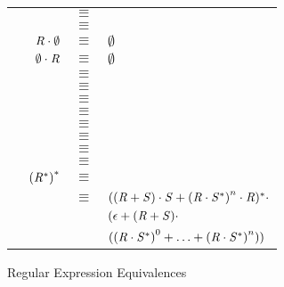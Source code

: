 \begin{figure}
\setcounter{rowcount}{0}
\centering
\begin{tabular}{lrcl}
\EqualityRule{} & \Regex{} & $\equiv$ & \Regex{} \\
\OrIdentityRule{} & \RegexOr{\Regex}{\emptyset} & $\equiv$ & \Regex{} \\
\EmptyProjectionRuleRightRule{} & $\mathit{R}\cdot\emptyset$ & $\equiv$ & $\emptyset$ \\
\EmptyProjectionRuleLeftRule{}\SubLeft{} & $\emptyset\cdot\mathit{R}$ & $\equiv$ & $\emptyset$ \\
\ConcatAssocRule{} & \RegexConcat{(\RegexConcat{\Regex{}}{\Regex'})}{\Regex''} & $\equiv$ & \RegexConcat{\Regex{}}{(\RegexConcat{\Regex'}{\Regex''})} \\
\OrAssociativityRule{} & \RegexOr{(\RegexOr{\Regex}{\Regex'})}{\Regex''} & $\equiv$ & \RegexOr{\Regex}{(\RegexOr{\Regex'}{\Regex''})} \\
\OrCommutativityRule{} & \RegexOr{\Regex{}}{\RegexAlt{}} & $\equiv$ & \RegexOr{\RegexAlt{}}{\Regex{}}\\
\DistributivityLeftRule{} & \RegexConcat{\Regex{}}{(\RegexOr{\Regex{}'}{\Regex{}''})} & $\equiv$ & \RegexOr{(\RegexConcat{\Regex{}}{\Regex{}'})}{(\RegexConcat{\Regex{}}{\Regex{}''})} \\
\DistributivityRightRule{} & \RegexConcat{(\RegexOr{\Regex{}'}{\Regex{}''})}{\Regex{}} & $\equiv$ & \RegexOr{(\RegexConcat{\Regex{}'}{\Regex{}})}{(\RegexConcat{\Regex{}''}{\Regex{}})} \\
\ConcatIdentityRule{} &\RegexConcat{\Regex{}}{\EmptyString{}} & $\equiv$ & \Regex{}\\
\SumstarRule{} &\StarOf{(\RegexOr{\Regex{}}{\RegexAlt{}})} & $\equiv$ & \RegexConcat{\StarOf{(\RegexConcat{\StarOf{\Regex{}}}{\RegexAlt{}})}}{\StarOf{\Regex{}}}\\
\ProductstarRule{} & \StarOf{(\RegexConcat{\Regex{}}{\RegexAlt{}})} & $\equiv$ & \RegexOr{\EmptyString{}}{(\RegexConcat{\RegexConcat{\Regex{}}{\StarOf{(\RegexConcat{\RegexAlt{}}{\Regex{}})}}}{\RegexAlt{}})}\\
\StarstarRule{} & ${(\mathit{R}{}^*)}^*$ & $\equiv$ & \StarOf{\Regex{}}\\
\DicyclicityRule{} & \StarOf{(\RegexOr{\Regex}{\RegexAlt})} & $\equiv$ & $((\mathit{R}+\mathit{S})\cdot\mathit{S}+{(\mathit{R}\cdot\mathit{S}^*)}^n\cdot\mathit{R})^*\cdot$\\
& & & $(\epsilon+(\mathit{R}+\mathit{S})\cdot$\\
& & & $({(\mathit{R}\cdot\mathit{S}^*)}^0+\ldots+{(\mathit{R}\cdot\mathit{S}^*)}^n))$
\end{tabular}
\caption{Regular Expression Equivalences}
\label{fig:regex-equivalence-rules}
\end{figure}
